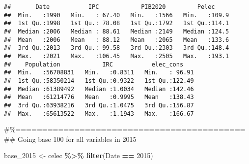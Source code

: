 \documentclass[
]{article}
\newenvironment{Shaded}{\begin{snugshade}}{\end{snugshade}}
\newcommand{\AttributeTok}[1]{\textcolor[rgb]{0.13,0.29,0.53}{#1}}
\newcommand{\CommentTok}[1]{\textcolor[rgb]{0.56,0.35,0.01}{\textit{#1}}}
\newcommand{\DecValTok}[1]{\textcolor[rgb]{0.00,0.00,0.81}{#1}}
\newcommand{\FunctionTok}[1]{\textcolor[rgb]{0.13,0.29,0.53}{\textbf{#1}}}
\newcommand{\NormalTok}[1]{#1}
\newcommand{\OtherTok}[1]{\textcolor[rgb]{0.56,0.35,0.01}{#1}}
\newcommand{\SpecialCharTok}[1]{\textcolor[rgb]{0.81,0.36,0.00}{\textbf{#1}}}
\begin{document}
\begin{verbatim}
##       Date           IPC            PIB2020         Pelec      
##  Min.   :1990   Min.   : 67.40   Min.   :1566   Min.   :109.9  
##  1st Qu.:1998   1st Qu.: 78.08   1st Qu.:1792   1st Qu.:114.1  
##  Median :2006   Median : 88.61   Median :2149   Median :124.5  
##  Mean   :2006   Mean   : 88.12   Mean   :2065   Mean   :133.6  
##  3rd Qu.:2013   3rd Qu.: 99.58   3rd Qu.:2303   3rd Qu.:148.4  
##  Max.   :2021   Max.   :106.45   Max.   :2505   Max.   :193.1  
##    Population            IRC           elec_cons     
##  Min.   :56708831   Min.   :0.8311   Min.   : 96.91  
##  1st Qu.:58350214   1st Qu.:0.9322   1st Qu.:122.49  
##  Median :61389492   Median :1.0034   Median :142.46  
##  Mean   :61214776   Mean   :0.9995   Mean   :138.43  
##  3rd Qu.:63938216   3rd Qu.:1.0475   3rd Qu.:156.87  
##  Max.   :65613522   Max.   :1.1943   Max.   :166.67
\end{verbatim}

\#\%=========================================== \#\# Going base 100 for
all variables in 2015

\begin{Shaded}
\begin{Highlighting}[]
\NormalTok{base\_2015 }\OtherTok{\textless{}{-}}\NormalTok{ celec }\SpecialCharTok{\%\textgreater{}\%} \FunctionTok{filter}\NormalTok{(Date }\SpecialCharTok{==} \DecValTok{2015}\NormalTok{)}
\end{Highlighting}
\end{Shaded}

\begin{Shaded}
\end{Shaded}
\end{document}
